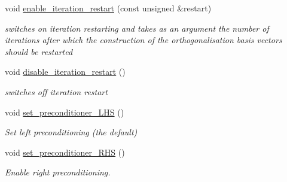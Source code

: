 \begin{DoxyCompactItemize}
void \hyperlink{classoomph_1_1GMRES_a95bf6049e720b55f13044704ade4c418}{enable\+\_\+iteration\+\_\+restart} (const unsigned \&restart)
\begin{DoxyCompactList}\small\item\em switches on iteration restarting and takes as an argument the number of iterations after which the construction of the orthogonalisation basis vectors should be restarted \end{DoxyCompactList}\item 
void \hyperlink{classoomph_1_1GMRES_ad9020f172d5679012fb0328c8b9415f2}{disable\+\_\+iteration\+\_\+restart} ()
\begin{DoxyCompactList}\small\item\em switches off iteration restart \end{DoxyCompactList}\item 
void \hyperlink{classoomph_1_1GMRES_ab46117fdc9252901bf02bd6a0f470ad6}{set\+\_\+preconditioner\+\_\+\+L\+HS} ()
\begin{DoxyCompactList}\small\item\em Set left preconditioning (the default) \end{DoxyCompactList}\item 
void \hyperlink{classoomph_1_1GMRES_a42ac539e54fda76307ab5c4920ad01e6}{set\+\_\+preconditioner\+\_\+\+R\+HS} ()
\begin{DoxyCompactList}\small\item\em Enable right preconditioning. \end{DoxyCompactList}\end{DoxyCompactItemize}
